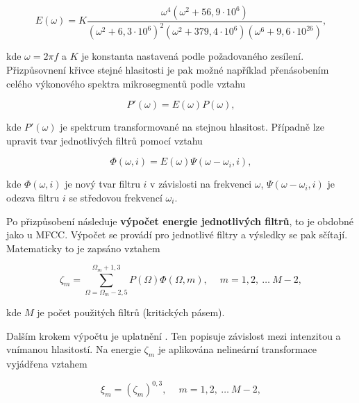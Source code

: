 \begin{equation}
  E\left(\omega\right) = K \frac{\omega^4\left(\omega^2 + 56,9 \cdot 10^6\right)}{\left(\omega^2 + 6,3 \cdot 10^6\right)^2\left(\omega^2 + 379,4 \cdot 10^6\right)\left(\omega^6 + 9,6 \cdot 10^{26}\right)},
  \label{eq:asr:plp:filter}
\end{equation}

\noindent kde $\omega = 2\pi f$ a $K$ je konstanta nastavená podle požadovaného zesílení. Přizpůsovnení křivce stejné hlasitosti je pak možné například přenásobením celého výkonového spektra mikrosegmentů podle vztahu

\begin{equation}
  P'\left(\omega\right) = E\left(\omega\right)P\left(\omega\right),
  \label{eq:asr:plp:filter:application1}
\end{equation}

\noindent kde $P'\left(\omega\right)$ je spektrum transformované na stejnou hlasitost. Případně lze upravit tvar jednotlivých filtrů pomocí vztahu

\begin{equation}
  \Phi\left(\omega, i\right) = E\left(\omega\right)\Psi\left(\omega - \omega_i, i\right),
  \label{eq:asr:plp:filter:application2}
\end{equation}

\noindent kde $\Phi\left(\omega, i\right)$ je nový tvar filtru $i$ v závislosti na frekvenci $\omega$, $\Psi\left(\omega - \omega_i, i\right)$ je odezva filtru $i$ se středovou frekvencí $\omega_i$.

Po přizpůsobení následuje \textbf{výpočet energie jednotlivých filtrů}, to je obdobné jako u MFCC. Výpočet se provádí pro jednotlivé filtry a výsledky se pak sčítají. Matematicky to je zapsáno vztahem

\begin{equation}
  \zeta_m = \sum_{\Omega = \Omega_m - 2,5}^{\Omega_m + 1,3} P\left(\Omega\right)\Phi\left(\Omega, m\right), \quad\ m=1, 2,\ \dots\ M - 2,
  \label{eq:asr:plp:energy}
\end{equation}

\noindent kde $M$ je počet použitých filtrů (kritických pásem).

Dalším krokem výpočtu je uplatnění \textbf{}. Ten popisuje závislost mezi intenzitou a vnímanou hlasitostí. Na energie $\zeta_m$ je aplikována nelineární transformace vyjádřena vztahem

\begin{equation}
  \xi_m = \left(\zeta_m\right)^{0,3}, \quad\ m = 1, 2,\ \dots\ M-2,
  \label{eq:asr:plp:energy:transform}
\end{equation}

